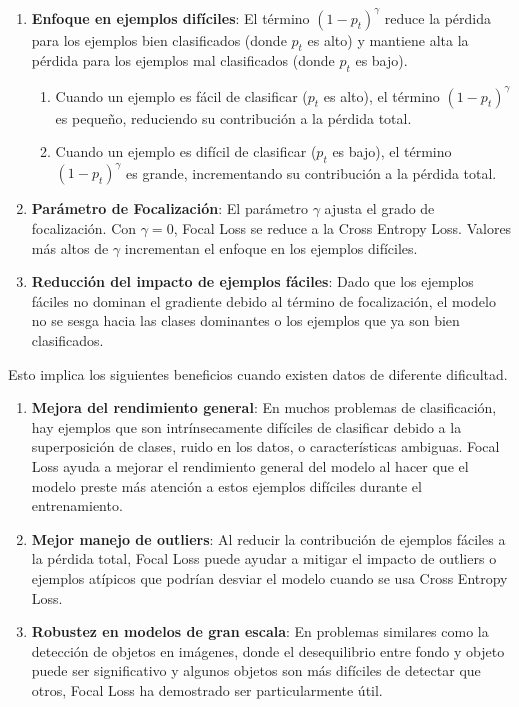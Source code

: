 \begin{enumerate}
	\item \textbf{Enfoque en ejemplos difíciles}: El término $(1 - p_t)^\gamma$ reduce la pérdida para los ejemplos bien clasificados (donde $p_t$ es alto) y mantiene alta la pérdida para los ejemplos mal clasificados (donde $p_t$ es bajo).
	
	\begin{enumerate}
		\item Cuando un ejemplo es fácil de clasificar ($p_t$ es alto), el término $(1 - p_t)^\gamma$ es pequeño, reduciendo su contribución a la pérdida total.
		\item Cuando un ejemplo es difícil de clasificar ($p_t$ es bajo), el término $(1 - p_t)^\gamma$ es grande, incrementando su contribución a la pérdida total.
	\end{enumerate}
	
	\item \textbf{Parámetro de Focalización}: El parámetro $\gamma$ ajusta el grado de focalización. Con $\gamma=0$, Focal Loss se reduce a la Cross Entropy Loss. Valores más altos de $\gamma$ incrementan el enfoque en los ejemplos difíciles.
	
	\item \textbf{Reducción del impacto de ejemplos fáciles}: Dado que los ejemplos fáciles no dominan el gradiente debido al término de focalización, el modelo no se sesga hacia las clases dominantes o los ejemplos que ya son bien clasificados.
	
\end{enumerate}

Esto implica los siguientes beneficios cuando existen datos de diferente dificultad.

\begin{enumerate}
	\item \textbf{Mejora del rendimiento general}: En muchos problemas de clasificación, hay ejemplos que son intrínsecamente difíciles de clasificar debido a la superposición de clases, ruido en los datos, o características ambiguas. Focal Loss ayuda a mejorar el rendimiento general del modelo al hacer que el modelo preste más atención a estos ejemplos difíciles durante el entrenamiento.
	
	\item \textbf{Mejor manejo de outliers}: Al reducir la contribución de ejemplos fáciles a la pérdida total, Focal Loss puede ayudar a mitigar el impacto de outliers o ejemplos atípicos que podrían desviar el modelo cuando se usa Cross Entropy Loss.
	
	\item \textbf{Robustez en modelos de gran escala}: En problemas similares como la detección de objetos en imágenes, donde el desequilibrio entre fondo y objeto puede ser significativo y algunos objetos son más difíciles de detectar que otros, Focal Loss ha demostrado ser particularmente útil.
	
\end{enumerate}

